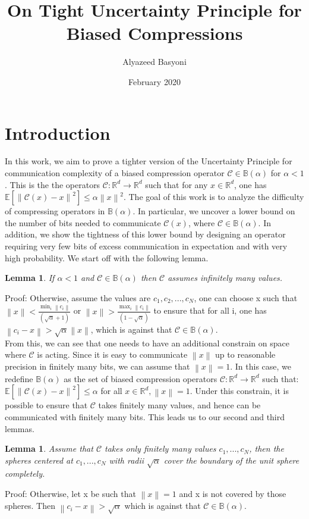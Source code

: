 \documentclass{article}
\title{On Tight Uncertainty Principle for Biased Compressions}
\author{Alyazeed Basyoni}
\date{February 2020}
\newtheorem{lemma}[theorem]{Lemma}
\newcommand{\norm}[1]{\left\| #1 \right\|}
\newcommand{\Exp}[1]{{\mathbb E}\left[#1\right]}
\newcommand{\R}{\mathbb{R}^d}
\newcommand{\B}{\mathbb{B}}
\begin{document}
\maketitle

\section{Introduction}
In this work, we aim to prove a tighter version of the Uncertainty Principle for communication complexity of a biased compression operator $\mathcal C \in \B(\alpha)$ for $\alpha < 1$. This is the the operators $\mathcal C : \R \to \R$ such that for any $x \in \R$, one has $\Exp{\norm{\mathcal C(x)-x}^2} \le \alpha \norm{x}^2$. The goal of this work is to analyze the difficulty of compressing operators in $\B(\alpha)$. In particular, we uncover a lower bound on the number of bits needed to communicate $\mathcal C(x)$, where $\mathcal C \in \B(\alpha)$. In addition, we show the tightness of this lower bound by designing an operator requiring very few bits of excess communication in expectation and with very high probability. We start off with the following lemma. 

\begin{lemma} 
If $\alpha < 1$ and $\mathcal C \in \B(\alpha)$ then $\mathcal C$ assumes infinitely many values.
\end{lemma}

Proof: Otherwise, assume the values are {$c_1, c_2, ..., c_N$}, one can choose x such that $\norm{x} < \frac{\min_i{\norm{c_i}}}{(\sqrt{\alpha}+1)}$ or $\norm{x} > \frac{\max_i{\norm{c_i}}}{(1-\sqrt{\alpha})}$ to ensure that for all i, one has $\norm{c_i-x} > \sqrt{\alpha}\norm{x}$, which is against that $\mathcal C \in \B(\alpha)$. \\

From this, we can see that one needs to have an additional constrain on space where $\mathcal C$ is acting. Since it is easy to communicate $\norm{x}$ up to reasonable precision in finitely many bits, we can assume that $\norm{x} = 1$. In this case, we redefine $\B(\alpha)$ as the set of biased compression operators $\mathcal C : \R \to \R$ such that: \\
$\Exp{\norm{\mathcal C(x)-x}^2} \le \alpha$ for all $x \in \R, \norm{x}=1$. Under this constrain, it is possible to ensure that $\mathcal C$ takes finitely many values, and hence can be communicated with finitely many bits. This leads us to our second and third lemmas.

\begin{lemma}
Assume that $\mathcal C$ takes only finitely many values $c_1,..., c_N$, then the spheres centered at $c_1,..., c_N$ with radii $\sqrt{\alpha}$ cover the boundary of the unit sphere completely.
\end{lemma}
Proof: Otherwise, let x be such that $\norm{x}=1$ and x is not covered by those spheres. Then $\norm{c_i-x} > \sqrt{\alpha}$ which is against that $\mathcal C \in \B(\alpha)$. 
\end{document}
